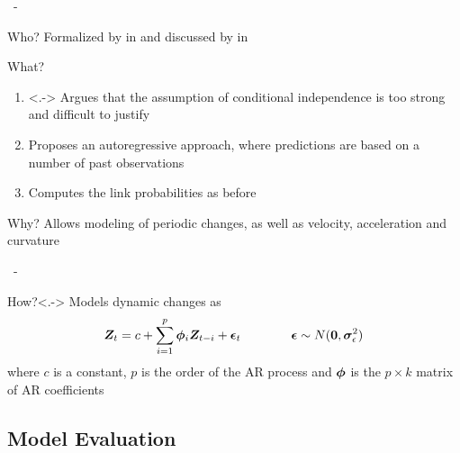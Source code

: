 \documentclass{beamer}
\newenvironment{xframe}
    {\begin{frame}{
        \ifx\insertsubsection\empty
            \strut
        \else\ifx\insertsubsubsection\empty
            \insertsection
        \else
            \insertsection~-~\insertsubsection
        \fi\fi
    }{
        \ifx\insertsubsection\empty
            \insertsection
        \else\ifx\insertsubsubsection\empty
            \insertsubsection
        \else
            \insertsubsubsection
        \fi\fi
    }}
    {\end{frame}}
\newenvironment{xblock}[1]
    {\begin{block}{#1}}
    {\end{block}}
\begin{document}
    \begin{xframe}
        \begin{xblock}{Who?}
             Formalized by \citeauthor{brockwell2016introduction} \cite{brockwell2016introduction} in \citeyear{brockwell2016introduction} and discussed by \citeauthor{sewell2018simultaneous} \cite{sewell2018simultaneous} in \citeyear{sewell2018simultaneous}
        \end{xblock}
        
        \begin{xblock}{What?}
            \begin{enumerate}
                \item<.-> Argues that the assumption of conditional independence is too strong and difficult to justify
                \item Proposes an autoregressive approach, where predictions are based on a number of past observations
                \item Computes the link probabilities as before
            \end{enumerate}
        \end{xblock}
        
        \begin{xblock}{Why?}
            Allows modeling of periodic changes, as well as velocity, acceleration and curvature
        \end{xblock}
    \end{xframe}
    
    \begin{xframe}
        \begin{xblock}{How?}<.->
            Models dynamic changes as 
            \[\bm{Z}_t = c+\sum_{i=1}^p \bm{\phi}_i \bm{Z}_{t-i} + \bm{\epsilon}_t \qquad\qquad \bm{\epsilon} \sim N(\bm{0},\bm{\sigma}_\epsilon^2)\]
            \pause
            where $c$ is a constant, $p$ is the order of the AR process and $\bm{\phi}$ is the $p\times k$ matrix of AR coefficients
        \end{xblock}
    \end{xframe}
    
    \subsection{Model Evaluation}
    
\end{document}
